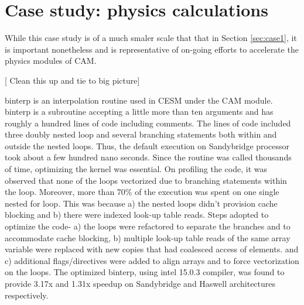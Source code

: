 \section{Case study: physics calculations}\label{sec:phys}

While this case study is of a much smaler scale that that in Section \ref{sec:case1}, it is important nonetheless and is representative of on-going efforts to accelerate the physics modules of CAM.


[{\color{red} Clean this up and tie to big picture}]

binterp is an interpolation routine used in CESM under the CAM module. binterp is a subroutine accepting a little more than ten arguments and has roughly a hundred lines of code including comments. The  lines of code included three doubly nested loop and several branching statements both within and outside the nested loops. Thus, the default execution on Sandybridge processor took about a few hundred nano seconds. Since the routine was called thousands of time, optimizing the kernel was essential.
On profiling the code, it was observed that none of the loops vectorized due to branching statements within the loop. Moreover, more than 70\% of the execution was spent on one single nested for loop. This was because a) the nested loops didn't provision cache blocking and b) there were indexed look-up table reads. Steps adopted to optimize the code- a) the loops were refactored to separate the branches and to accommodate cache blocking, b) multiple look-up table reads of the same array variable were replaced with new copies that had coalesced access of elements. and c) additional flags/directives were added to align arrays and to force vectorization on the loops. 
The optimized binterp, using intel 15.0.3 compiler, was found to provide 3.17x and 1.31x speedup on Sandybridge and Haswell architectures respectively. 

